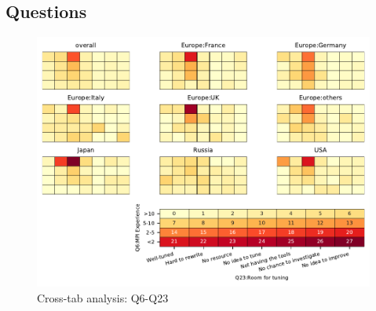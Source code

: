 
\subsection{Questions}


\begin{figure}
\begin{center}
\includegraphics[width=12cm]{../pdfs/Q6-Q23.pdf}
\caption{Cross-tab analysis: Q6-Q23}
\label{fig:Q6-Q23}
\end{center}
\end{figure}
